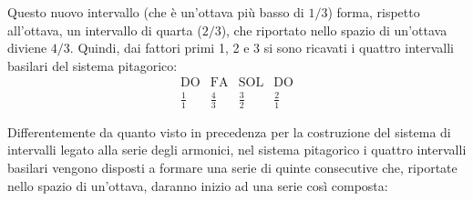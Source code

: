 \begin{center}
\end{center}

Questo nuovo intervallo (che è un'ottava più basso di $1/3$) forma, rispetto
all'ottava, un intervallo di quarta ($2/3$), che riportato nello spazio di
un'ottava diviene $4/3$. Quindi, dai fattori primi 1, 2 e 3 si sono ricavati i
quattro intervalli basilari del sistema pitagorico:
\[
  \begin{array}{cccc}
    \text{DO} & \text{FA} & \text{SOL} & \text{DO} \\[4pt]
    \tfrac{1}{1} & \tfrac{4}{3} & \tfrac{3}{2} & \tfrac{2}{1}
  \end{array}
\]

Differentemente da quanto visto in precedenza per la costruzione del sistema di
intervalli legato alla serie degli armonici, nel sistema pitagorico i quattro
intervalli basilari vengono disposti a formare una serie di quinte consecutive
che, riportate nello spazio di un'ottava, daranno inizio ad una serie così
composta:

\begin{center}\small
{}
\end{center}

